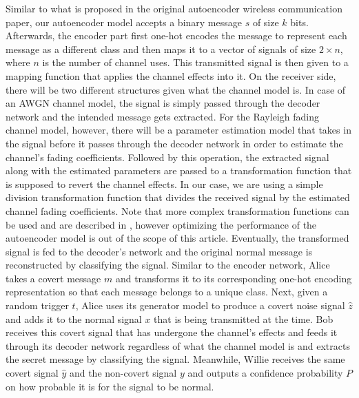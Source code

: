 Similar to what is proposed in the original autoencoder wireless communication paper, our autoencoder model accepts a binary message \(s\) of size \(k\) bits. Afterwards, the encoder part first one-hot encodes the message to represent each message as a different class and then maps it to a vector of signals of size \(2 \times n\), where \(n\) is the number of channel uses. This transmitted signal is then given to a mapping function that applies the channel effects into it. On the receiver side, there will be two different structures given what the channel model is. In case of an AWGN channel model, the signal is simply passed through the decoder network and the intended message gets extracted. For the Rayleigh fading channel model, however, there will be a parameter estimation model that takes in the signal before it passes through the decoder network in order to estimate the channel's fading coefficients. Followed by this operation, the extracted signal along with the estimated parameters are passed to a transformation function that is supposed to revert the channel effects. In our case, we are using a simple division transformation function that divides the received signal by the estimated channel fading coefficients. Note that more complex transformation functions can be used and are described in \cite{o2017introduction}, however optimizing the performance of the autoencoder model is out of the scope of this article. Eventually, the transformed signal is fed to the decoder's network and the original normal message is reconstructed by classifying the signal. Similar to the encoder network, Alice takes a covert message \(m\) and transforms it to its corresponding one-hot encoding representation so that each message belongs to a unique class. Next, given a random trigger \(t\), Alice uses its generator model to produce a covert noise signal \(\hat{z}\) and adds it to the normal signal \(x\) that is being transmitted at the time. Bob receives this covert signal that has undergone the channel's effects and feeds it through its decoder network regardless of what the channel model is and extracts the secret message by classifying the signal. Meanwhile, Willie receives the same covert signal \(\hat{y}\) and the non-covert signal \(y\) and outputs a confidence probability \(P\) on how probable it is for the signal to be normal.
